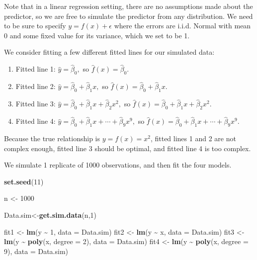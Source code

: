 \documentclass[
]{book}
\newenvironment{Shaded}{\begin{snugshade}}{\end{snugshade}}
\newcommand{\AttributeTok}[1]{\textcolor[rgb]{0.13,0.29,0.53}{#1}}
\newcommand{\DecValTok}[1]{\textcolor[rgb]{0.00,0.00,0.81}{#1}}
\newcommand{\FunctionTok}[1]{\textcolor[rgb]{0.13,0.29,0.53}{\textbf{#1}}}
\newcommand{\NormalTok}[1]{#1}
\newcommand{\OtherTok}[1]{\textcolor[rgb]{0.56,0.35,0.01}{#1}}
\newcommand{\SpecialCharTok}[1]{\textcolor[rgb]{0.81,0.36,0.00}{\textbf{#1}}}
\providecommand{\tightlist}{%
  \setlength{\itemsep}{0pt}\setlength{\parskip}{0pt}}
\begin{document}
Note that in a linear regression setting, there are no assumptions made about the predictor, so we are free to simulate the predictor from any distribution. We need to be sure to specify \(y = f(x) + \epsilon\) where the errors are i.i.d. Normal with mean 0 and some fixed value for its variance, which we set to be 1.

We consider fitting a few different fitted lines for our simulated data:

\begin{enumerate}
\def\labelenumi{\arabic{enumi}.}
\tightlist
\item
  Fitted line 1: \(\hat{y} = \hat{\beta}_0,\) so \(\hat{f}(x) = \hat{\beta}_0\).
\item
  Fitted line 2: \(\hat{y} = \hat{\beta}_0 + \hat{\beta}_1 x,\) so \(\hat{f}(x) = \hat{\beta}_0 + \hat{\beta}_1 x\).
\item
  Fitted line 3: \(\hat{y} = \hat{\beta}_0 + \hat{\beta}_1 x + \hat{\beta}_2 x^2,\) so \(\hat{f}(x) = \hat{\beta}_0 + \hat{\beta}_1 x + \hat{\beta}_2 x^2\).
\item
  Fitted line 4: \(\hat{y} = \hat{\beta}_0 + \hat{\beta}_1 x + \cdots + \hat{\beta}_9 x^9,\) so \(\hat{f}(x) = \hat{\beta}_0 + \hat{\beta}_1 x + \cdots + \hat{\beta}_9 x^9\).
\end{enumerate}

Because the true relationship is \(y = f(x) = x^2\), fitted lines 1 and 2 are not complex enough, fitted line 3 should be optimal, and fitted line 4 is too complex.

We simulate 1 replicate of 1000 observations, and then fit the four models.

\begin{Shaded}
\begin{Highlighting}[]
\FunctionTok{set.seed}\NormalTok{(}\DecValTok{11}\NormalTok{)}

\NormalTok{n }\OtherTok{\textless{}{-}} \DecValTok{1000}

\NormalTok{Data.sim}\OtherTok{\textless{}{-}}\FunctionTok{get.sim.data}\NormalTok{(n,}\DecValTok{1}\NormalTok{)}

\NormalTok{fit1 }\OtherTok{\textless{}{-}} \FunctionTok{lm}\NormalTok{(y }\SpecialCharTok{\textasciitilde{}} \DecValTok{1}\NormalTok{,                   }\AttributeTok{data =}\NormalTok{ Data.sim)}
\NormalTok{fit2 }\OtherTok{\textless{}{-}} \FunctionTok{lm}\NormalTok{(y }\SpecialCharTok{\textasciitilde{}}\NormalTok{ x,                   }\AttributeTok{data =}\NormalTok{ Data.sim)}
\NormalTok{fit3 }\OtherTok{\textless{}{-}} \FunctionTok{lm}\NormalTok{(y }\SpecialCharTok{\textasciitilde{}} \FunctionTok{poly}\NormalTok{(x, }\AttributeTok{degree =} \DecValTok{2}\NormalTok{), }\AttributeTok{data =}\NormalTok{ Data.sim)}
\NormalTok{fit4 }\OtherTok{\textless{}{-}} \FunctionTok{lm}\NormalTok{(y }\SpecialCharTok{\textasciitilde{}} \FunctionTok{poly}\NormalTok{(x, }\AttributeTok{degree =} \DecValTok{9}\NormalTok{), }\AttributeTok{data =}\NormalTok{ Data.sim)}
\end{Highlighting}
\end{Shaded}
\end{document}
